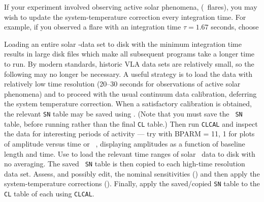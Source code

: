 If your experiment involved observing active solar phenomena,
(\eg\ flares), you may wish to update the system-temperature
correction every integration time.  For example, if you observed a
flare with an integration time $\tau = 1.67$ seconds, choose

     Loading an entire solar \uv-data set to disk with the minimum
integration time results in large disk files which make all subsequent
programs take a longer time to run.  By modern standards, historic VLA
data sets are relatively small, so the following may no longer be
necessary.  A useful strategy is to load the data with relatively low
time resolution (20--30 seconds for observations of active solar
phenomena) and to proceed with the usual continuum data calibration,
deferring the system temperature correction.  When a satisfactory
calibration is obtained, the relevant {\tt SN} table may be saved
using \hbox{{\tt {}}}.  (Note that you must save the {\tt
  SN} table, before running {\tt {}} rather than the final
{\tt CL} table.)  Then run {\tt CLCAL} and inspect the data for
interesting periods of activity --- try {\tt {}} with {\us
  BPARM = 11, 1} for plots of amplitude versus time or {\tt
  }, displaying amplitudes as a function of baseline
length and time.  Use {\tt {}} to load the relevant time
ranges of solar \uv\ data to disk with no averaging. The saved {\tt
  SN} table is then copied to each high-time resolution data set.
Assess, and possibly edit, the nominal sensitivities
() and then apply the system-temperature corrections
().  Finally, apply the saved/copied {\tt SN} table to
the {\tt CL} table of each using \hbox{{\tt CLCAL}}.


